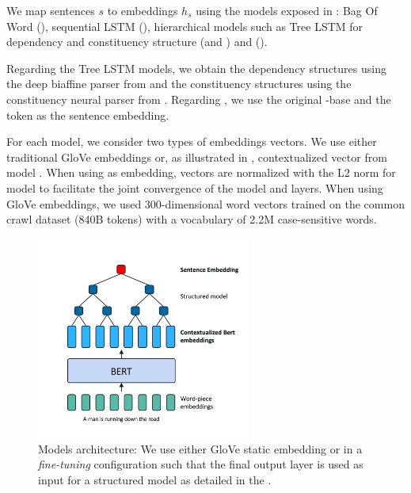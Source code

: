 We map sentences $s$ to embeddings $h_s$ using the models exposed in : Bag Of Word (\bow), sequential LSTM (\seq),  hierarchical models such as Tree LSTM for dependency and constituency structure (\dep and \const) and \bert (\cls).

Regarding the Tree LSTM  models, we obtain the dependency structures using the deep biaffine parser from \textcite{dozat_17} and the constituency structures using the constituency neural parser from \textcite{klein_18}. Regarding \bert, we use the original \bert-base and the \cls token as the sentence embedding. 

For each model, we consider two types of embeddings vectors. We use either traditional GloVe embeddings \parencite{pennington_14} or, as illustrated in , contextualized vector from \bert model \parencite{devlin_19}. When using \bert as embedding, vectors are normalized with the L2 norm for \bow model to facilitate the joint convergence of the model and \bert layers. When using GloVe embeddings, we used 300-dimensional word vectors trained on the common crawl dataset (840B tokens) with a vocabulary of 2.2M case-sensitive words.

\begin{figure}[!htb]
\begin{center}
\includegraphics[width=7cm]{images/model-struct.png}
\end{center}
\caption{Models architecture: We use either GloVe static embedding or \bert in a \textit{fine-tuning} configuration such that the final output layer is used as input for a structured model as detailed in the .}
\end{figure}

